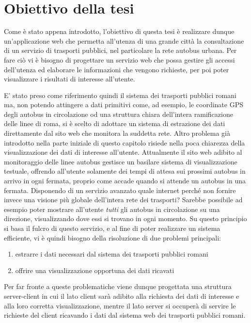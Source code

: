 \section{Obiettivo della tesi} %
\label{sec:section_name}

Come è stato appena introdotto, l'obiettivo di questa tesi è realizzare dunque un'applicazione web che permetta all'utenza di una grande città la consultazione di un servizio di trasporti pubblici, nel particolare la rete autobus urbana.
Per fare ciò vi è bisogno di progettare un servizio web che possa gestire gli accessi dell'utenza ed elaborare le informazioni che vengono richieste, per poi poter visualizzare i risultati di interesse all'utente.

E' stato preso come riferimento quindi il sistema dei trasporti pubblici romani ma, non potendo attingere a dati primitivi come, ad esempio, le coordinate GPS degli autobus in circolazione od una struttura chiara dell'intera ramificazione delle linee di roma, si è scelto di adottare un sistema di estrazione dei dati direttamente dal sito web che monitora la suddetta rete.
Altro problema già introdotto nella parte iniziale di questo capitolo risiede nella poca chiarezza della visualizzazione dei dati di interesse all'utente. Attualmente il sito web adibito al monitoraggio delle linee autobus gestisce  un basilare sistema di visualizzazione testuale, offrendo all'utente solamente dei tempi di attesa sui prossimi autobus in arrivo in ogni fermata, proprio come accade quando si attende un autobus in una fermata.
Disponendo di un servizio avanzato quale internet perché non fornire invece una visione più globale dell'intera rete dei trasporti? Sarebbe possibile ad esempio poter mostrare all'utente {\itshape tutti} gli autobus in circolazione su una direzione, visualizzando dove essi si trovano in ogni momento.
Su questo principio si basa il fulcro di questo servizio, e al fine di poter realizzare un sistema efficiente, vi è quindi bisogno della risoluzione di due problemi principali:

\begin{enumerate}
    \item estrarre i dati necessari dal sistema dei trasporti pubblici romani
    \item offrire una visualizzazione opportuna dei dati ricavati
\end{enumerate}

Per far fronte a queste problematiche viene dunque progettata una struttura server-client in cui il lato client sarà adibito alla richiesta dei dati di interesse e alla loro corretta visualizzazione, mentre il lato server si occuperà di servire le richieste del client ricavando i dati dal sistema web dei trasporti pubblici romani.

